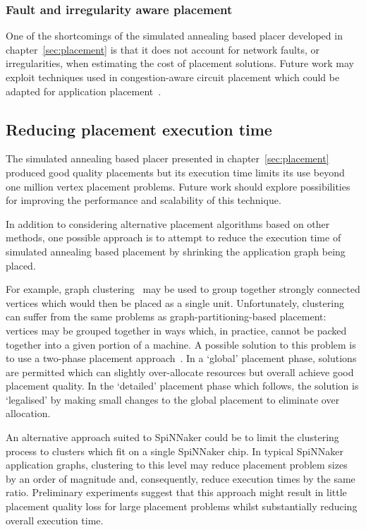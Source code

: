 			\subsubsection{Fault and irregularity aware placement}
				
				One of the shortcomings of the simulated annealing based placer
				developed in chapter~\ref{sec:placement} is that it does not account
				for network faults, or irregularities, when estimating the cost of
				placement solutions.  Future work may exploit techniques used in
				congestion-aware circuit placement which could be adapted for
				application placement~\cite{viswanathan07}.
		
		\subsection{Reducing placement execution time}
			
			The simulated annealing based placer presented in
			chapter~\ref{sec:placement} produced good quality placements but its
			execution time limits its use beyond one million vertex placement
			problems. Future work should explore possibilities for improving the
			performance and scalability of this technique.
			
			In addition to considering alternative placement algorithms based on
			other methods, one possible approach is to attempt to reduce the execution
			time of simulated annealing based placement by shrinking the application
			graph being placed.
			
			For example, graph clustering~\cite{schaeffer07} may be used to group
			together strongly connected vertices which would then be placed as a
			single unit.  Unfortunately, clustering can suffer from the same problems
			as graph-partitioning-based placement: vertices may be grouped together
			in ways which, in practice, cannot be packed together into a given portion
			of a machine.  A possible solution to this problem is to use a two-phase
			placement approach~\cite{kahng11}. In a `global' placement phase,
			solutions are permitted which can slightly over-allocate resources but
			overall achieve good placement quality. In the `detailed' placement phase
			which follows, the solution is `legalised' by making small changes to the
			global placement to eliminate over allocation.
			
			An alternative approach suited to SpiNNaker could be to limit the
			clustering process to clusters which fit on a single SpiNNaker chip. In
			typical SpiNNaker application graphs, clustering to this level may reduce
			placement problem sizes by an order of magnitude and, consequently,
			reduce execution times by the same ratio. Preliminary experiments suggest
			that this approach might result in little placement quality loss for
			large placement problems whilst substantially reducing overall execution
			time.
		
